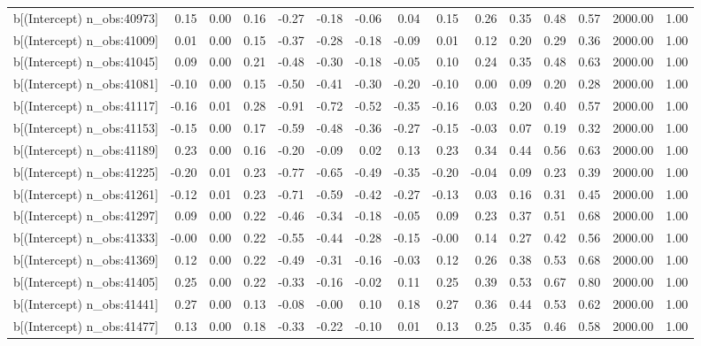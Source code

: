 \begin{table}[ht]
\begin{tabular}{rrrrrrrrrrrrrrr}
  b[(Intercept) n\_obs:40973] & 0.15 & 0.00 & 0.16 & -0.27 & -0.18 & -0.06 & 0.04 & 0.15 & 0.26 & 0.35 & 0.48 & 0.57 & 2000.00 & 1.00 \\ 
  b[(Intercept) n\_obs:41009] & 0.01 & 0.00 & 0.15 & -0.37 & -0.28 & -0.18 & -0.09 & 0.01 & 0.12 & 0.20 & 0.29 & 0.36 & 2000.00 & 1.00 \\ 
  b[(Intercept) n\_obs:41045] & 0.09 & 0.00 & 0.21 & -0.48 & -0.30 & -0.18 & -0.05 & 0.10 & 0.24 & 0.35 & 0.48 & 0.63 & 2000.00 & 1.00 \\ 
  b[(Intercept) n\_obs:41081] & -0.10 & 0.00 & 0.15 & -0.50 & -0.41 & -0.30 & -0.20 & -0.10 & 0.00 & 0.09 & 0.20 & 0.28 & 2000.00 & 1.00 \\ 
  b[(Intercept) n\_obs:41117] & -0.16 & 0.01 & 0.28 & -0.91 & -0.72 & -0.52 & -0.35 & -0.16 & 0.03 & 0.20 & 0.40 & 0.57 & 2000.00 & 1.00 \\ 
  b[(Intercept) n\_obs:41153] & -0.15 & 0.00 & 0.17 & -0.59 & -0.48 & -0.36 & -0.27 & -0.15 & -0.03 & 0.07 & 0.19 & 0.32 & 2000.00 & 1.00 \\ 
  b[(Intercept) n\_obs:41189] & 0.23 & 0.00 & 0.16 & -0.20 & -0.09 & 0.02 & 0.13 & 0.23 & 0.34 & 0.44 & 0.56 & 0.63 & 2000.00 & 1.00 \\ 
  b[(Intercept) n\_obs:41225] & -0.20 & 0.01 & 0.23 & -0.77 & -0.65 & -0.49 & -0.35 & -0.20 & -0.04 & 0.09 & 0.23 & 0.39 & 2000.00 & 1.00 \\ 
  b[(Intercept) n\_obs:41261] & -0.12 & 0.01 & 0.23 & -0.71 & -0.59 & -0.42 & -0.27 & -0.13 & 0.03 & 0.16 & 0.31 & 0.45 & 2000.00 & 1.00 \\ 
  b[(Intercept) n\_obs:41297] & 0.09 & 0.00 & 0.22 & -0.46 & -0.34 & -0.18 & -0.05 & 0.09 & 0.23 & 0.37 & 0.51 & 0.68 & 2000.00 & 1.00 \\ 
  b[(Intercept) n\_obs:41333] & -0.00 & 0.00 & 0.22 & -0.55 & -0.44 & -0.28 & -0.15 & -0.00 & 0.14 & 0.27 & 0.42 & 0.56 & 2000.00 & 1.00 \\ 
  b[(Intercept) n\_obs:41369] & 0.12 & 0.00 & 0.22 & -0.49 & -0.31 & -0.16 & -0.03 & 0.12 & 0.26 & 0.38 & 0.53 & 0.68 & 2000.00 & 1.00 \\ 
  b[(Intercept) n\_obs:41405] & 0.25 & 0.00 & 0.22 & -0.33 & -0.16 & -0.02 & 0.11 & 0.25 & 0.39 & 0.53 & 0.67 & 0.80 & 2000.00 & 1.00 \\ 
  b[(Intercept) n\_obs:41441] & 0.27 & 0.00 & 0.13 & -0.08 & -0.00 & 0.10 & 0.18 & 0.27 & 0.36 & 0.44 & 0.53 & 0.62 & 2000.00 & 1.00 \\ 
  b[(Intercept) n\_obs:41477] & 0.13 & 0.00 & 0.18 & -0.33 & -0.22 & -0.10 & 0.01 & 0.13 & 0.25 & 0.35 & 0.46 & 0.58 & 2000.00 & 1.00 \\ 

\end{tabular}
\end{table}
